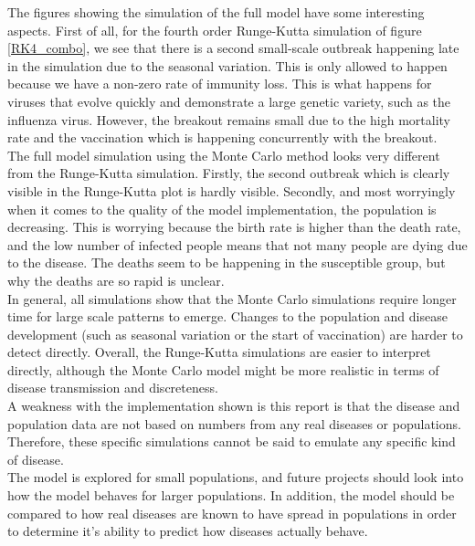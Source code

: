 \documentclass[notitlepage, reprint, nofootinbib]{revtex4-1}
\begin{document}
The figures showing the simulation of the full model have some interesting aspects. First of all, for the fourth order Runge-Kutta simulation of figure \ref{RK4_combo}, we see that there is a second small-scale outbreak happening late in the simulation due to the seasonal variation. This is only allowed to happen because we have a non-zero rate of immunity loss. This is what happens for viruses that evolve quickly and demonstrate a large genetic variety, such as the influenza virus.  However, the breakout remains small due to the high mortality rate and the vaccination which is happening concurrently with the breakout. \\[2mm]
The full model simulation using the Monte Carlo method looks very different from the Runge-Kutta simulation. Firstly, the second outbreak which is clearly visible in the Runge-Kutta plot is hardly visible. Secondly, and most worryingly when it comes to the quality of the model implementation, the population is decreasing. This is worrying because the birth rate is higher than the death rate, and the low number of infected people means that not many people are dying due to the disease. The deaths seem to be happening in the susceptible group, but why the deaths are so rapid is unclear.\\[2mm]
In general, all simulations show that the Monte Carlo simulations require longer time for large scale patterns to emerge. Changes to the population and disease development (such as seasonal variation or the start of vaccination) are harder to detect directly. Overall, the Runge-Kutta simulations are easier to interpret directly, although the Monte Carlo model might be more realistic in terms of disease transmission and discreteness.\\[2mm]
A weakness with the implementation shown is this report is that the disease and population data are not based on numbers from any real diseases or populations. Therefore, these specific simulations cannot be said to emulate any specific kind of disease.\\[2mm]
The model is explored for small populations, and future projects should look into how the model behaves for larger populations. In addition, the model should be compared to how real diseases are known to have spread in populations in order to determine it's ability to predict how diseases actually behave.
\end{document}
